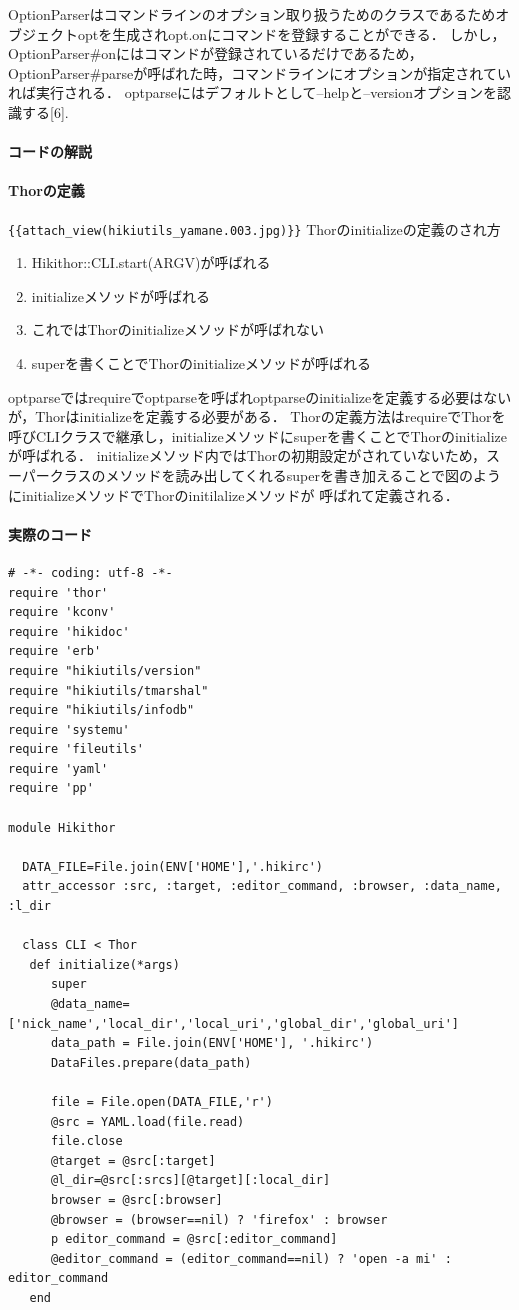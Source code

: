 OptionParserはコマンドラインのオプション取り扱うためのクラスであるためオブジェクトoptを生成されopt.onにコマンドを登録することができる．
しかし，OptionParser\#onにはコマンドが登録されているだけであるため，OptionParser\#parseが呼ばれた時，コマンドラインにオプションが指定されていれば実行される．
optparseにはデフォルトとして--helpと--versionオプションを認識する[6].

\paragraph{コードの解説}
\paragraph{Thorの定義}
\verb|{{attach_view(hikiutils_yamane.003.jpg)}}|
Thorのinitializeの定義のされ方

\begin{enumerate}
\item Hikithor::CLI.start(ARGV)が呼ばれる
\item initializeメソッドが呼ばれる
\item これではThorのinitializeメソッドが呼ばれない
\item superを書くことでThorのinitializeメソッドが呼ばれる
\end{enumerate}
optparseではrequireでoptparseを呼ばれoptparseのinitializeを定義する必要はないが，Thorはinitializeを定義する必要がある．
Thorの定義方法はrequireでThorを呼びCLIクラスで継承し，initializeメソッドにsuperを書くことでThorのinitializeが呼ばれる．
initializeメソッド内ではThorの初期設定がされていないため，スーパークラスのメソッドを読み出してくれるsuperを書き加えることで図のようにinitializeメソッドでThorのinitilalizeメソッドが
呼ばれて定義される．

\paragraph{実際のコード}\begin{lstlisting}[style=customRuby]
# -*- coding: utf-8 -*-                                                         
require 'thor'
require 'kconv'
require 'hikidoc'
require 'erb'
require "hikiutils/version"
require "hikiutils/tmarshal"
require "hikiutils/infodb"
require 'systemu'
require 'fileutils'
require 'yaml'
require 'pp'

module Hikithor

  DATA_FILE=File.join(ENV['HOME'],'.hikirc')
  attr_accessor :src, :target, :editor_command, :browser, :data_name, :l_dir

  class CLI < Thor
   def initialize(*args)
      super
      @data_name=['nick_name','local_dir','local_uri','global_dir','global_uri']
      data_path = File.join(ENV['HOME'], '.hikirc')
      DataFiles.prepare(data_path)

      file = File.open(DATA_FILE,'r')
      @src = YAML.load(file.read)
      file.close
      @target = @src[:target]
      @l_dir=@src[:srcs][@target][:local_dir]
      browser = @src[:browser]
      @browser = (browser==nil) ? 'firefox' : browser
      p editor_command = @src[:editor_command]
      @editor_command = (editor_command==nil) ? 'open -a mi' : editor_command
   end
\end{lstlisting}
